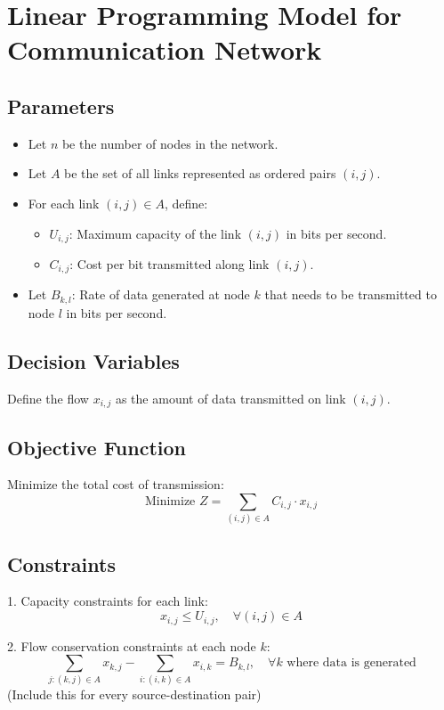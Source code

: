 \documentclass{article}
\begin{document}
\section*{Linear Programming Model for Communication Network}

\subsection*{Parameters}
\begin{itemize}
    \item Let \( n \) be the number of nodes in the network.
    \item Let \( A \) be the set of all links represented as ordered pairs \( (i, j) \).
    \item For each link \( (i, j) \in A \), define:
        \begin{itemize}
            \item \( U_{i,j} \): Maximum capacity of the link \( (i, j) \) in bits per second.
            \item \( C_{i,j} \): Cost per bit transmitted along link \( (i, j) \).
        \end{itemize}
    \item Let \( B_{k,l} \): Rate of data generated at node \( k \) that needs to be transmitted to node \( l \) in bits per second.
\end{itemize}

\subsection*{Decision Variables}
Define the flow \( x_{i,j} \) as the amount of data transmitted on link \( (i, j) \). 

\subsection*{Objective Function}
Minimize the total cost of transmission:
\[
\text{Minimize } Z = \sum_{(i,j) \in A} C_{i,j} \cdot x_{i,j}
\]

\subsection*{Constraints}
1. Capacity constraints for each link:
\[
x_{i,j} \leq U_{i,j}, \quad \forall (i,j) \in A
\]

2. Flow conservation constraints at each node \( k \):
\[
\sum_{j: (k,j) \in A} x_{k,j} - \sum_{i: (i,k) \in A} x_{i,k} = B_{k,l}, \quad \forall k \text{ where data is generated}
\]
(Include this for every source-destination pair)
\end{document}
